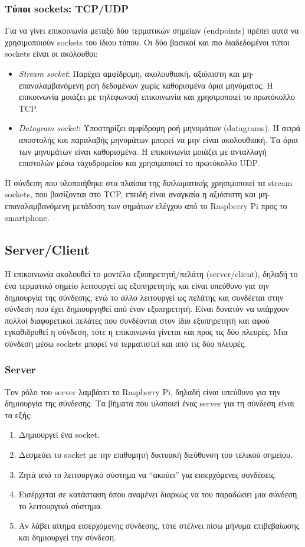 \subsubsection{Τύποι sockets: TCP/UDP}
Για να γίνει επικοινωνία μεταξύ δύο τερματικών σημείων (endpoints) πρέπει αυτά να χρησιμοποιούν sockets του ίδιου τύπου. Οι δύο βασικοί και πιο διαδεδομένοι τύποι sockets είναι οι ακόλουθοι:
\begin{itemize}
    \item \emph{Stream socket}: Παρέχει αμφίδρομη, ακολουθιακή, αξιόπιστη και μη-επαναλαμβανόμενη ροή δεδομένων χωρίς καθορισμένα όρια μηνύματος. Η επικοινωνία μοιάζει με τηλεφωνική επικοινωνία και χρησιμοποιεί το πρωτόκολλο TCP.
    \item \emph{Datagram socket}: Υποστηρίζει αμφίδρομη ροή μηνυμάτων (datagrams). Η σειρά αποστολής και παραλαβής μηνυμάτων μπορεί να μην είναι  ακολουθιακή. Τα όρια των μηνυμάτων είναι καθορισμένα. Η επικοινωνία μοιάζει με ανταλλαγή επιστολών μέσω ταχυδρομείου και χρησιμοποιεί το πρωτόκολλο UDP.
\end{itemize}
Η σύνδεση που υλοποιήθηκε στα πλαίσια της διπλωματικής χρησιμοποιεί τα stream sockets, που βασίζονται στο TCP, επειδή είναι αναγκαία η αξιόπιστη και μη-επαναλαμβανόμενη μετάδοση των σημάτων ελέγχου από το Raspberry Pi προς το smartphone.

\subsection{Server/Client}
Η επικοινωνία ακολουθεί το μοντέλο εξυπηρετητή/πελάτη (server/client), δηλαδή το ένα τερματικό σημείο λειτουργεί ως εξυπηρετητής και είναι υπεύθυνο για την δημιουργία της σύνδεσης, ενώ το άλλο λειτουργεί ως πελάτης και συνδέεται στην σύνδεση που έχει δημιουργηθεί από έναν εξυπηρετητή. Είναι δυνατόν να υπάρχουν πολλοί διαφορετικοί πελάτες που συνδέονται στον ίδιο εξυπηρετητή και αφού εγκαθιδρυθεί η σύνδεση, τότε η επικοινωνία γίνεται και προς τις δύο πλευρές. Μια σύνδεση μέσω sockets μπορεί να τερματιστεί και από τις δύο πλευρές.

\subsubsection{Server}
Τον ρόλο του server λαμβάνει το Raspberry Pi, δηλαδή είναι υπεύθυνο για την δημιουργία της σύνδεσης. Τα βήματα που υλοποιεί ένας server για τη σύνδεση είναι τα εξής:
\begin{enumerate}
    \item Δημιουργεί ένα socket.
    \item Δεσμεύει το socket με την επιθυμητή δικτυακή διεύθυνση του τελικού σημείου.
    \item Ζητά από το λειτουργικό σύστημα να “ακούει” για εισερχόμενες συνδέσεις.
    \item Εισέρχεται σε κατάσταση όπου αναμένει διαρκώς να του παραδώσει μια σύνδεση το λειτουργικό σύστημα.
    \item Αν λάβει αίτημα εισερχόμενης σύνδεσης, τότε στέλνει πίσω μήνυμα επιβεβαίωσης και δημιουργεί την σύνδεση.
\end{enumerate}

